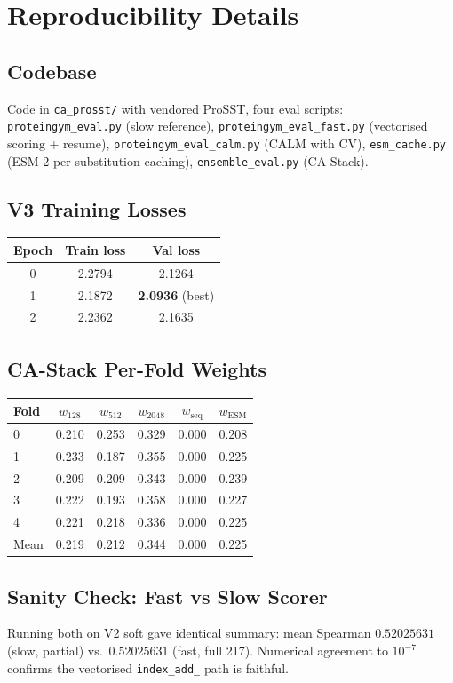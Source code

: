 \documentclass[11pt,a4paper]{article}
\begin{document}
\appendix
\section{Reproducibility Details}

\subsection{Codebase}
Code in \texttt{ca\_prosst/} with vendored ProSST, four eval scripts:
\texttt{proteingym\_eval.py} (slow reference), \texttt{proteingym\_eval\_fast.py}
(vectorised scoring + resume), \texttt{proteingym\_eval\_calm.py}
(CALM with CV), \texttt{esm\_cache.py} (ESM-2 per-substitution caching),
\texttt{ensemble\_eval.py} (CA-Stack).

\subsection{V3 Training Losses}

\begin{table}[h]
\centering
\begin{tabular}{ccc}
\toprule
Epoch & Train loss & Val loss \\
\midrule
0 & 2.2794 & 2.1264 \\
1 & 2.1872 & \textbf{2.0936} (best) \\
2 & 2.2362 & 2.1635 \\
\bottomrule
\end{tabular}
\end{table}

\subsection{CA-Stack Per-Fold Weights}

\begin{table}[h]
\centering
\small
\begin{tabular}{lccccc}
\toprule
Fold & $w_{128}$ & $w_{512}$ & $w_{2048}$ & $w_\text{seq}$ & $w_\text{ESM}$ \\
\midrule
0 & 0.210 & 0.253 & 0.329 & 0.000 & 0.208 \\
1 & 0.233 & 0.187 & 0.355 & 0.000 & 0.225 \\
2 & 0.209 & 0.209 & 0.343 & 0.000 & 0.239 \\
3 & 0.222 & 0.193 & 0.358 & 0.000 & 0.227 \\
4 & 0.221 & 0.218 & 0.336 & 0.000 & 0.225 \\
\midrule
Mean & 0.219 & 0.212 & 0.344 & 0.000 & 0.225 \\
\bottomrule
\end{tabular}
\end{table}

\subsection{Sanity Check: Fast vs Slow Scorer}
Running both on V2 soft gave identical summary: mean Spearman
$0.52025631$ (slow, partial) vs.\ $0.52025631$ (fast, full 217).
Numerical agreement to $10^{-7}$ confirms the vectorised
\texttt{index\_add\_} path is faithful.
\end{document}
